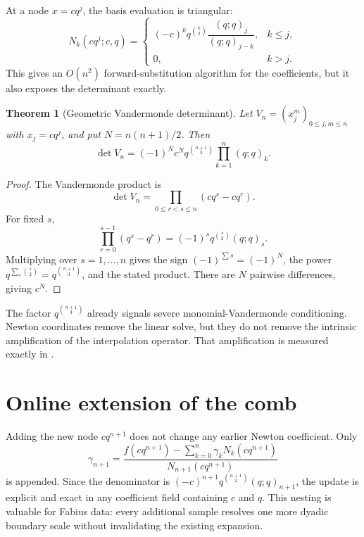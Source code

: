 \documentclass[11pt,oneside]{book}
\numberwithin{equation}{chapter}
\newtheorem{theorem}{Theorem}[chapter]
\theoremstyle{definition}
\theoremstyle{remark}
\begin{document}
At a node $x=cq^j$, the basis evaluation is triangular:
\begin{equation}
 N_k(cq^j;c,q)=
 \begin{cases}
 (-c)^kq^{\binom k2}\dfrac{(q;q)_j}{(q;q)_{j-k}},&k\le j,\\[1.1ex]
 0,&k>j.
 \end{cases}
 \label{eq:newton-node-evaluation}
\end{equation}
This gives an $O(n^2)$ forward-substitution algorithm for the coefficients,
but it also exposes the determinant exactly.

\begin{theorem}[Geometric Vandermonde determinant]
\label{thm:geometric-vandermonde}
Let $V_n=(x_j^m)_{0\le j,m\le n}$ with $x_j=cq^j$, and put
$N=n(n+1)/2$.  Then
\begin{equation}
 \boxed{
 \det V_n=(-1)^N c^Nq^{\binom{n+1}{3}}
             \prod_{k=1}^n(q;q)_k.}
 \label{eq:geometric-vandermonde}
\end{equation}
\end{theorem}

\begin{proof}
The Vandermonde product is
\[
 \det V_n=\prod_{0\le r<s\le n}(cq^s-cq^r).
\]
For fixed $s$,
\[
 \prod_{r=0}^{s-1}(q^s-q^r)
 =(-1)^sq^{\binom s2}(q;q)_s.
\]
Multiplying over $s=1,\ldots,n$ gives the sign
$(-1)^{\sum s}=(-1)^N$, the power
$q^{\sum_s\binom s2}=q^{\binom{n+1}{3}}$, and the stated product.  There are
$N$ pairwise differences, giving $c^N$.
\end{proof}

The factor $q^{\binom{n+1}{3}}$ already signals severe monomial-Vandermonde
conditioning.  Newton coordinates remove the linear solve, but they do not
remove the intrinsic amplification of the interpolation operator.  That
amplification is measured exactly in .

\section{Online extension of the comb}

Adding the new node $cq^{n+1}$ does not change any earlier Newton
coefficient.  Only
\begin{equation}
 \gamma_{n+1}
 =\frac{f(cq^{n+1})-\sum_{k=0}^n\gamma_kN_k(cq^{n+1})}
        {N_{n+1}(cq^{n+1})}
 \label{eq:online-newton}
\end{equation}
is appended.  Since the denominator is
$(-c)^{n+1}q^{\binom{n+1}{2}}(q;q)_{n+1}$, the update is explicit and exact
in any coefficient field containing $c$ and $q$.  This nesting is valuable
for Fabius data: every additional sample resolves one more dyadic boundary
scale without invalidating the existing expansion.
\end{document}
